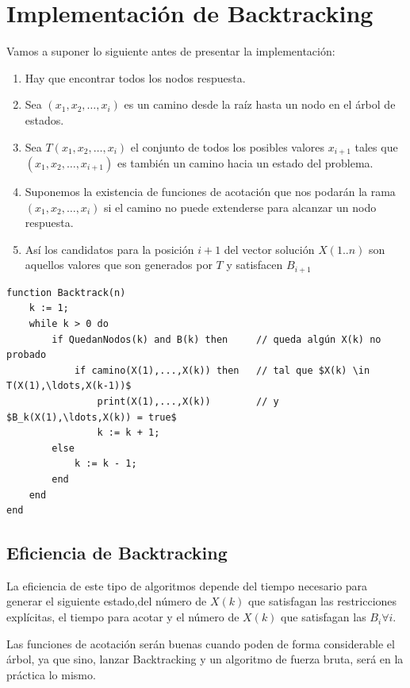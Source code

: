 \documentclass[10pt,a4paper,spanish]{report}
\theoremstyle{definition}
\theoremstyle{remark}
\begin{document}
\section{\textcolor{electricgreen}Implementación de Backtracking}

Vamos a suponer lo siguiente antes de presentar la implementación:
    
\begin{enumerate}[---]
    \item Hay que encontrar todos los nodos respuesta.
    \item Sea $(x_1,x_2,\ldots,x_i)$ es un camino desde la raíz hasta un nodo en el árbol de estados.
    \item Sea $T(x_1,x_2,\ldots,x_i)$ el conjunto de todos los posibles valores $x_{i+1}$ tales que $(x_1,x_2,\ldots,x_{i+1})$ es también un camino hacia un estado del problema.
    \item Suponemos la existencia de funciones de acotación que nos podarán la rama $(x_1,x_2,\ldots,x_i)$ si el camino no puede extenderse para alcanzar un nodo respuesta.
    \item Así los candidatos para la posición $i+1$ del vector solución $X(1..n)$ son aquellos valores que son generados por $T$ y satisfacen $B_{i+1}$
\end{enumerate}

\begin{verbatim}
function Backtrack(n)
    k := 1;
    while k > 0 do
        if QuedanNodos(k) and B(k) then     // queda algún X(k) no probado 
            if camino(X(1),...,X(k)) then   // tal que $X(k) \in T(X(1),\ldots,X(k-1))$ 
                print(X(1),...,X(k))        // y $B_k(X(1),\ldots,X(k)) = true$
                k := k + 1;
        else
            k := k - 1;
        end
    end
end
\end{verbatim}

\subsection{\textcolor{electricgreen}Eficiencia de Backtracking}

La eficiencia de este tipo de algoritmos depende del tiempo necesario para generar el siguiente estado,del número de $X(k)$ que satisfagan las restricciones explícitas, el tiempo para acotar y el número de $X(k)$ que satisfagan las $B_i \forall i$.

Las funciones de acotación serán buenas cuando poden de forma considerable el árbol, ya que sino, lanzar Backtracking y un algoritmo de fuerza bruta, será en la práctica lo mismo.
\end{document}
